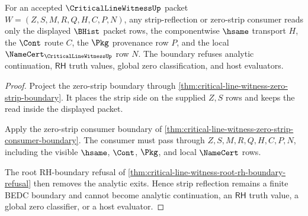\begin{theorem}
\label{thm:critical-line-witness-strip-reflection-boundary}
For an accepted $\CriticalLineWitnessUp$ packet $W=(Z,S,M,R,Q,H,C,P,N)$, any strip-reflection or zero-strip consumer reads only the displayed $\BHist$ packet rows, the componentwise $\hsame$ transport $H$, the $\Cont$ route $C$, the $\Pkg$ provenance row $P$, and the local $\NameCert_{\CriticalLineWitnessUp}$ row $N$. The boundary refuses analytic continuation, $\mathsf{RH}$ truth values, global zero classification, and host evaluators.
\end{theorem}
\begin{proof}
Project the zero-strip boundary through \autoref{thm:critical-line-witness-zero-strip-boundary}. It places the strip side on the supplied $Z,S$ rows and keeps the read inside the displayed packet.

Apply the zero-strip consumer boundary of \autoref{thm:critical-line-witness-zero-strip-consumer-boundary}. The consumer must pass through $Z,S,M,R,Q,H,C,P,N$, including the visible $\hsame$, $\Cont$, $\Pkg$, and local $\NameCert$ rows.

The root RH-boundary refusal of \autoref{thm:critical-line-witness-root-rh-boundary-refusal} then removes the analytic exits. Hence strip reflection remains a finite BEDC boundary and cannot become analytic continuation, an $\mathsf{RH}$ truth value, a global zero classifier, or a host evaluator.
\end{proof}

